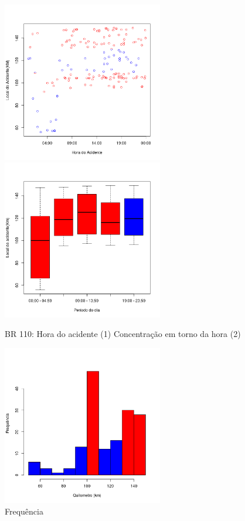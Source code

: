 \begin{figure}[h]
	\caption{BR 110: Hora do acidente (1)  Concentração em torno da hora (2)}
	\includegraphics[width=7cm,height=7cm]{Figuras/Preprocess/br110_1.png}
	\includegraphics[width=7cm,height=7cm]{Figuras/Preprocess/br110_2.png}

\end{figure}


\quad \quad
\begin{figure}[h]
	\centering
	\caption{ Frequência}
	\includegraphics[width=7cm,height=7cm]{Figuras/Preprocess/br110_3.png}
\end{figure}

